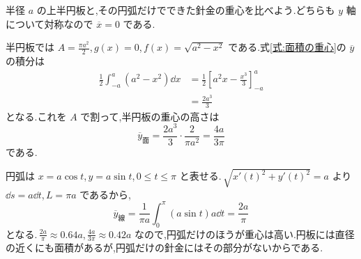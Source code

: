 半径 $a$ の上半円板と,その円弧だけでできた針金の重心を比べよう.どちらも $y$ 軸について対称なので $\overline x=0$ である.

半円板では $A=\frac{\pi a^2}{2}$,\,$g(x)=0$,\,$f(x)=\sqrt{a^2-x^2}$ である.式\eqref{式:面積の重心}の $\overline y$ の積分は
\begin{align*}
\frac12\int_{-a}^a(a^2-x^2)\dd x
 &=\frac12\left[a^2x-\frac{x^3}{3}\right]_{-a}^a\\
 &=\frac{2a^3}{3}
\end{align*}
となる.これを $A$ で割って,半円板の重心の高さは
\begin{equation}\label{式:半円板の重心}
\overline y_{\mathrm{面}}=\frac{2a^3}{3}\cdot\frac{2}{\pi a^2}=\frac{4a}{3\pi}
\end{equation}
である.

円弧は $x=a\cos t$,\,$y=a\sin t$,\,$0\le t\le\pi$ と表せる.\,$\sqrt{x'(t)^2+y'(t)^2}=a$ より $\dd s=a\dd t$,\,$L=\pi a$ であるから,
\begin{equation}\label{式:半円弧の重心}
\overline y_{\mathrm{線}}
 =\frac{1}{\pi a}\int_0^\pi(a\sin t)a\dd t
 =\frac{2a}{\pi}
\end{equation}
となる.\,$\frac{2a}{\pi}\approx0.64a$,\,$\frac{4a}{3\pi}\approx0.42a$ なので,円弧だけのほうが重心は高い.円板には直径の近くにも面積があるが,円弧だけの針金にはその部分がないからである.
